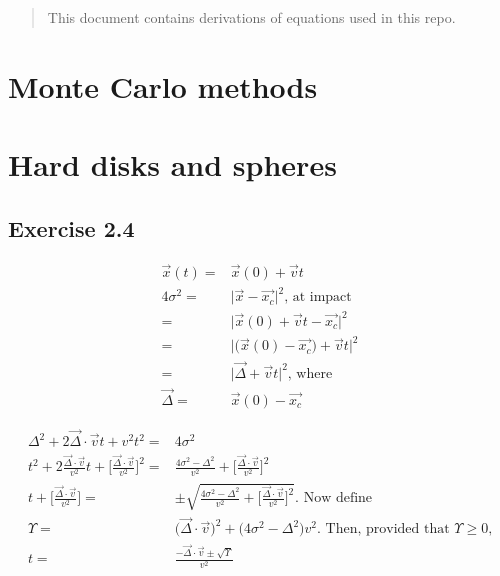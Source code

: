 \documentclass[]{article}
\title{}
\author{}
\begin{document}
\maketitle

\begin{abstract}
This document contains derivations of equations used in this repo.
\end{abstract}
\tableofcontents
\listoffigures
\section{Monte Carlo methods}

\section{Hard disks and spheres}

\subsection{Exercise 2.4}
\begin{align*}
	\vec{x}(t) =& \vec{x}(0)+\vec{v}t\\
	4\sigma^2 =& \vert \vec{x} - \vec{x_c} \vert^2 \text{, at impact}\\
	=& \vert \vec{x}(0)+\vec{v}t  - \vec{x_c}\vert^2\\
	=& \vert \big(\vec{x}(0)- \vec{x_c}\big)+\vec{v}t  \vert^2\\
	=& \vert \vec{\Delta}+\vec{v}t   \vert^2 \text{, where }\\
	\vec{\Delta} =&\vec{x}(0)- \vec{x_c}
\end{align*}

\begin{align*}
	\Delta^2 + 2 \vec{\Delta}\cdot\vec{v}t + v^2t^2 =& 4\sigma^2\\
	t^2 + 2\frac{\vec{\Delta}\cdot\vec{v}}{v^2}t + \big[\frac{\vec{\Delta}\cdot\vec{v}}{v^2}\big]^2=& \frac{ 4\sigma^2 - \Delta^2}{v^2}  + \big[\frac{\vec{\Delta}\cdot\vec{v}}{v^2}\big]^2\\
	t + \big[\frac{\vec{\Delta}\cdot\vec{v}}{v^2}\big]=& \pm \sqrt{\frac{ 4\sigma^2 - \Delta^2}{v^2}  + \big[\frac{\vec{\Delta}\cdot\vec{v}}{v^2}\big]^2} \text{. Now define} \\
	\Upsilon =&\big( \vec{\Delta}\cdot\vec{v}\big)^2 +  \big(4\sigma^2 - \Delta^2\big) v^2 \text{. Then, provided that $\Upsilon\ge 0$,}\\
	t=&\frac{-\vec{\Delta}\cdot\vec{v} \pm \sqrt{\Upsilon}}{v^2}
\end{align*}
\end{document}
